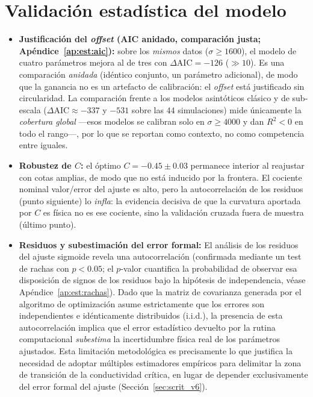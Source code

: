 \section{Validación estadística del modelo}
\label{sec:validacion_v6}

\begin{itemize}
\item \textbf{Justificación del \emph{offset} (AIC anidado, comparación justa; Apéndice~\ref{ap:est:aic}):} sobre los \emph{mismos} datos ($\sigma\ge1600$), el modelo de cuatro parámetros mejora al de tres con $\Delta\mathrm{AIC}=-126$ ($\gg10$). Es una comparación \emph{anidada} (idéntico conjunto, un parámetro adicional), de modo que la ganancia no es un artefacto de calibración: el \emph{offset} está justificado sin circularidad. La comparación frente a los modelos asintóticos clásico y de sub-escala ($\Delta\mathrm{AIC}\approx-337$ y $-531$ sobre las $44$ simulaciones) mide únicamente la \emph{cobertura global} ---esos modelos se calibran solo en $\sigma\ge4000$ y dan $R^2<0$ en todo el rango---, por lo que se reportan como contexto, no como competencia entre iguales.
\item \textbf{Robustez de $C$:} el óptimo $C=-0.45\pm0.03$ permanece interior al reajustar con cotas amplias, de modo que no está inducido por la frontera. El cociente nominal valor/error del ajuste es alto, pero la autocorrelación de los residuos (punto siguiente) lo \emph{infla}: la evidencia decisiva de que la curvatura aportada por $C$ es física no es ese cociente, sino la validación cruzada fuera de muestra (último punto).
\item \textbf{Residuos y subestimación del error formal:} El análisis de los residuos del ajuste sigmoide revela una autocorrelación (confirmada mediante un test de rachas con $p<0.05$; el $p$-valor cuantifica la probabilidad de observar esa disposición de signos de los residuos bajo la hipótesis de independencia, véase Apéndice~\ref{ap:est:rachas}). Dado que la matriz de covarianza generada por el algoritmo de optimización asume estrictamente que los errores son independientes e idénticamente distribuidos (i.i.d.), la presencia de esta autocorrelación implica que el error estadístico devuelto por la rutina computacional \emph{subestima} la incertidumbre física real de los parámetros ajustados. Esta limitación metodológica es precisamente lo que justifica la necesidad de adoptar múltiples estimadores empíricos para delimitar la zona de transición de la conductividad crítica, en lugar de depender exclusivamente del error formal del ajuste (Sección~\ref{sec:scrit_v6}).

\end{itemize}
